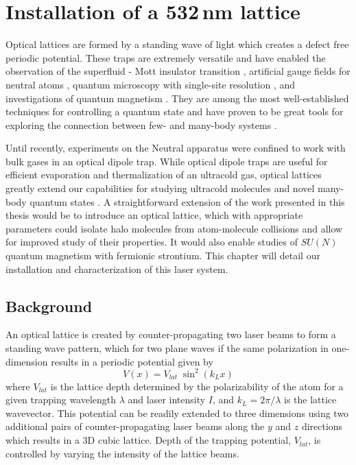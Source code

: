 \chapter{Installation of a 532\,nm lattice} \label{ch:chap6}
	
Optical lattices are formed by a standing wave of light which creates a defect free periodic potential.
These traps are extremely versatile and have enabled the observation of the superfluid - Mott insulator transition \cite{gme02}, artificial gauge fields for neutral atoms \cite{Lin2011a}, quantum microscopy with single-site resolution \cite{Bakr2009}, and investigations of quantum magnetism \cite{Hart2015,Greif2015}. 
They are among the most well-established techniques for controlling a quantum state and have proven to be great tools for exploring the connection between few- and many-body systems \cite{bdz08}.

Until recently, experiments on the Neutral apparatus were confined to work with bulk gases in an optical dipole trap.
While optical dipole traps are useful for efficient evaporation and thermalization of an ultracold gas, optical lattices greatly extend our capabilities for studying ultracold molecules and novel many-body quantum states \cite{mtj00,Thalhammer2006,mob06,lsb08,Cappellini2014,zbb14}.
A straightforward extension of the work presented in this thesis would be to introduce an optical lattice, which with appropriate parameters could isolate halo molecules from atom-molecule collisions and allow for improved study of their properties.
It would also enable studies of $SU(N)$ quantum magnetism with fermionic strontium.
This chapter will detail our installation and characterization of this laser system.

\section{Background} \label{sec:latBackground}
An optical lattice is created by counter-propagating two laser beams to form a standing wave pattern, which for two plane waves if the same polarization in one-dimension results in a periodic potential given by 
	\begin{equation} \label{eq:1dlattice}
		 V(x) = V_{lat} \; \sin^2(k_L x)
	\end{equation}
where $V_{lat}$ is the lattice depth determined by the polarizability of the atom for a given trapping wavelength $\lambda$ and laser intensity $I$, and $k_L = 2\pi / \lambda$ is the lattice wavevector.
This potential can be readily extended to three dimensions using two additional pairs of counter-propagating laser beams along the $y$ and $z$ directions which results in a 3D cubic lattice.
Depth of the trapping potential, $V_{lat}$, is controlled by varying the intensity of the lattice beams.

